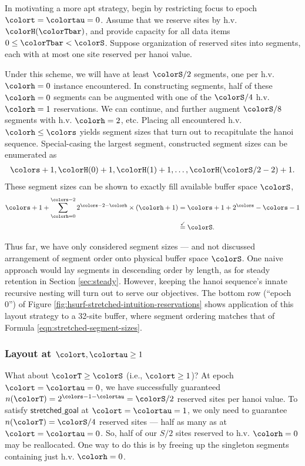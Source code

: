 In motivating a more apt strategy, begin by restricting focus to epoch $\colort=\colortau=0$.
Assume that we reserve sites by h.v. $\colorH(\colorTbar)$, and provide capacity for all data items $0\leq \colorTbar < \colorS$.
Suppose organization of reserved sites into segments, each with at most one site reserved per hanoi value.

Under this scheme, we will have at least $\colorS/2$ segments, one per h.v. $\colorh=0$ instance encountered.
In constructing segments, half of these $\colorh=0$ segments can be augmented with one of the $\colorS/4$ h.v. $\colorh=1$ reservations.
We can continue, and further augment $\colorS/8$ segments with h.v. $\colorh=2$, etc.
Placing all encountered h.v. $\colorh\leq\colors$ yields segment sizes that turn out to recapitulate the hanoi sequence.
Special-casing the largest segment, constructed segment sizes can be enumerated as
\begin{align}
\colors + 1, \colorH(0) + 1, \colorH(1) + 1, \ldots, \colorH(\colorS/2 - 2) + 1.
\label{eqn:stretched-segment-sizes}
\end{align}
These segment sizes can be shown to exactly fill available buffer space $\colorS$,
\begin{align*}
\colors + 1
+  \sum_{\colorh = 0}^{\colors - 2}
2^{\colors - 2 - \colorh} \times (\colorh + 1)
&=
\colors + 1 +
2^{\colors} - \colors - 1\\
&\stackrel{\checkmark}{=}
\colorS.
\end{align*}

Thus far, we have only considered segment sizes --- and not discussed arrangement of segment order onto physical buffer space $\colorS$.
One naive approach would lay segments in descending order by length, as for steady retention in Section \ref{sec:steady}.
However, keeping the hanoi sequence's innate recursive nesting will turn out to serve our objectives.
The bottom row (``epoch 0'') of Figure \ref{fig:hsurf-stretched-intuition-reservations} shows application of this layout strategy to a 32-site buffer, where segment ordering matches that of Formula \ref{eqn:stretched-segment-sizes}.

\subsubsection{Layout at $\colort,\colortau\geq1$}

What about $\colorT \geq \colorS$ (i.e., $\colort \geq 1$)?
At epoch $\colort=\colortau=0$, we have successfully guaranteed $n(\colorT) = 2^{\colors - 1 - \colortau} = \colorS / 2$ reserved sites per hanoi value.
To satisfy $\textsf{stretched\_goal}$ at $\colort=\colortau=1$, we only need to guarantee $n(\colorT) = \colorS/4$ reserved sites --- half as many as at $\colort=\colortau=0$.
So, half of our $S/2$ sites reserved to h.v. $\colorh=0$ may be reallocated.
One way to do this is by freeing up the singleton segments containing just h.v. $\colorh=0$.

